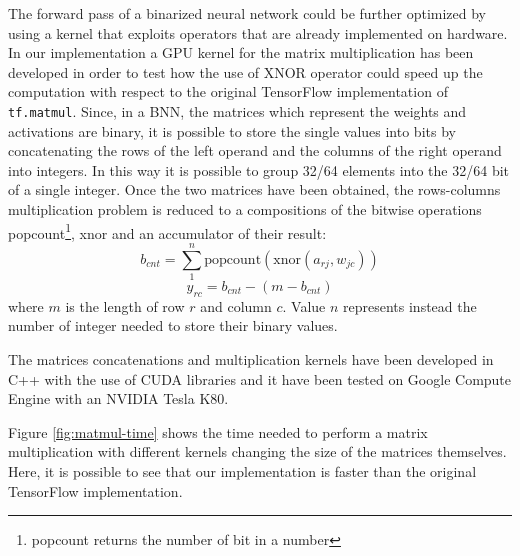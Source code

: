 \documentclass[a4paper]{article}
\numberwithin{equation}{section} %
\numberwithin{figure}{section} %
\numberwithin{table}{section} %
\theoremstyle{definition}
\begin{document}
The forward pass of a binarized neural network could be further optimized
by using a kernel that exploits operators that are already implemented on
hardware. In our implementation a GPU kernel for the matrix multiplication
has been developed in order to test how the use of XNOR operator could
speed up the computation with respect to the original TensorFlow implementation
of \texttt{tf.matmul}.
Since, in a BNN, the matrices which represent the weights and activations are binary, it is possible to store the single values into bits by concatenating the rows of the left operand and the columns of the right operand into integers. In this way it is possible to group 32/64 elements into the 32/64 bit of a single integer.
Once the two matrices have been obtained, the rows-columns multiplication problem is reduced to a compositions of the bitwise operations popcount\footnote{popcount returns the number of bit in a number}, xnor and an accumulator of their result:
\begin{equation*}
	b_{cnt} = \sum_{1}^{n}\text{popcount}(\text{xnor}(a_{rj}, w_{jc}))
\end{equation*}
\begin{equation*}
	y_{rc} = b_{cnt} - (m - b_{cnt})
\end{equation*}
where $m$ is the length of row $r$ and column $c$. Value $n$ represents instead the number of integer needed to store their binary values.

The matrices concatenations and multiplication kernels have been developed in C++ with the use of CUDA libraries and it have been tested on Google Compute Engine with an NVIDIA Tesla K80.

Figure \ref{fig:matmul-time} shows the time needed to perform a matrix
multiplication with different kernels changing the size of the matrices
themselves. Here, it is possible to see that our implementation is faster
than the original TensorFlow implementation.
\end{document}
